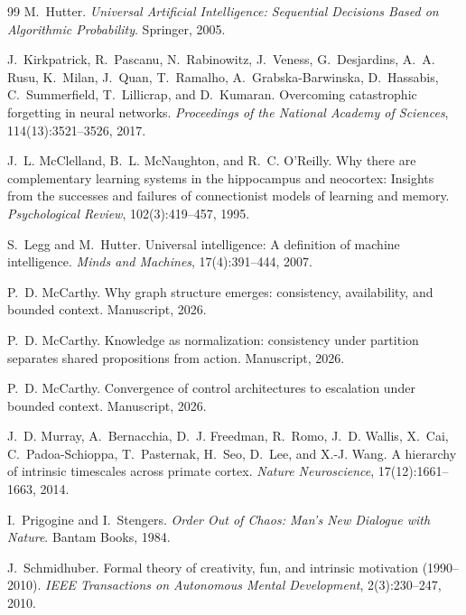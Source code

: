 \documentclass[11pt]{article}
\theoremstyle{definition}
\theoremstyle{remark}
\begin{document}
\begin{thebibliography}{99}
M.~Hutter.
\newblock \emph{Universal Artificial Intelligence: Sequential Decisions Based
  on Algorithmic Probability}.
\newblock Springer, 2005.

J.~Kirkpatrick, R.~Pascanu, N.~Rabinowitz, J.~Veness, G.~Desjardins,
  A.~A. Rusu, K.~Milan, J.~Quan, T.~Ramalho, A.~Grabska-Barwinska,
  D.~Hassabis, C.~Summerfield, T.~Lillicrap, and D.~Kumaran.
\newblock Overcoming catastrophic forgetting in neural networks.
\newblock \emph{Proceedings of the National Academy of Sciences},
  114(13):3521--3526, 2017.

J.~L. McClelland, B.~L. McNaughton, and R.~C. O'Reilly.
\newblock Why there are complementary learning systems in the hippocampus
  and neocortex: Insights from the successes and failures of connectionist
  models of learning and memory.
\newblock \emph{Psychological Review}, 102(3):419--457, 1995.

S.~Legg and M.~Hutter.
\newblock Universal intelligence: A definition of machine intelligence.
\newblock \emph{Minds and Machines}, 17(4):391--444, 2007.

P.~D. McCarthy.
\newblock Why graph structure emerges: consistency, availability, and bounded context.
\newblock Manuscript, 2026.

P.~D. McCarthy.
\newblock Knowledge as normalization: consistency under partition separates
  shared propositions from action.
\newblock Manuscript, 2026.

P.~D. McCarthy.
\newblock Convergence of control architectures to escalation under bounded
  context.
\newblock Manuscript, 2026.

J.~D. Murray, A.~Bernacchia, D.~J. Freedman, R.~Romo, J.~D. Wallis,
  X.~Cai, C.~Padoa-Schioppa, T.~Pasternak, H.~Seo, D.~Lee, and
  X.-J. Wang.
\newblock A hierarchy of intrinsic timescales across primate cortex.
\newblock \emph{Nature Neuroscience}, 17(12):1661--1663, 2014.

I.~Prigogine and I.~Stengers.
\newblock \emph{Order Out of Chaos: Man's New Dialogue with Nature}.
\newblock Bantam Books, 1984.

J.~Schmidhuber.
\newblock Formal theory of creativity, fun, and intrinsic motivation
  (1990--2010).
\newblock \emph{IEEE Transactions on Autonomous Mental Development},
  2(3):230--247, 2010.


\end{thebibliography}
\end{document}
